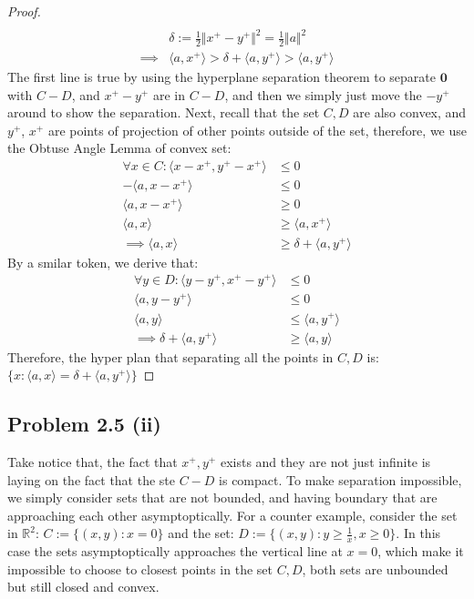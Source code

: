 \documentclass[]{article}
\theoremstyle{definition}
\begin{document}
\begin{proof}
\begin{align}
                \\
                & \delta := \frac{1}{2}\Vert x^+ - y^+\Vert^2 = \frac{1}{2}\Vert a \Vert^2
                \\
                \implies & 
                \langle a, x^+\rangle > \delta + \langle a, y^+\rangle > \langle a, y^+\rangle
            \end{align}
            The first line is true by using the hyperplane separation theorem to separate $\mathbf 0$ with $C -D$, and $x^+ - y^+$ are in $C -D$, and then we simply just move the $-y^+$ around to show the separation. Next, recall that the set $C, D$ are also convex, and $y^+$, $x^+$ are points of projection of other points outside of the set, therefore, we use the Obtuse Angle Lemma of convex set: 
            \begin{align}
                \forall x \in C: 
                \langle x - x^+, y^+ - x^+\rangle &\le 0
                \\
                -\langle a, x - x^+\rangle &\le 0 
                \\
                \langle a, x - x^+\rangle & \ge 0 
                \\
                \langle a, x\rangle &\ge \langle a , x^+\rangle
                \\
                \implies 
                \langle a, x\rangle &\ge \delta + \langle a, y^+\rangle
            \end{align}
            By a smilar token, we derive that: 
            \begin{align}
                \forall y \in D: \langle y - y^+, x^+ - y^+\rangle 
                &\le 0 
                \\
                \langle a, y - y^+\rangle & \le 0 
                \\
                \langle a, y\rangle &\le \langle a, y^+\rangle
                \\
                \implies
                \delta + \langle a, y^+\rangle &\ge \langle a, y\rangle
            \end{align}
            Therefore, the hyper plan that separating all the points in $C, D$ is: $\{x: \langle a, x\rangle = \delta + \langle a, y^+\rangle\}$
        \end{proof}
    \subsection{Problem 2.5 (ii)}
        Take notice that, the fact that $x^+, y^+$ exists and they are not just infinite is laying on the fact that the ste $C -D$ is compact. To make separation impossible, we simply consider sets that are not bounded, and having boundary that are approaching each other asymptoptically. 
        For a counter example, consider the set in $\mathbb R^2$: $C:=\{(x, y): x = 0\}$ and the set: $D:=\{(x, y): y \ge \frac{1}{x}, x \ge 0\}$. In this case the sets asymptoptically approaches the vertical line at $x = 0$, which make it impossible to choose to closest points in the set $C, D$, both sets are unbounded but still closed and convex. 
\end{document}
